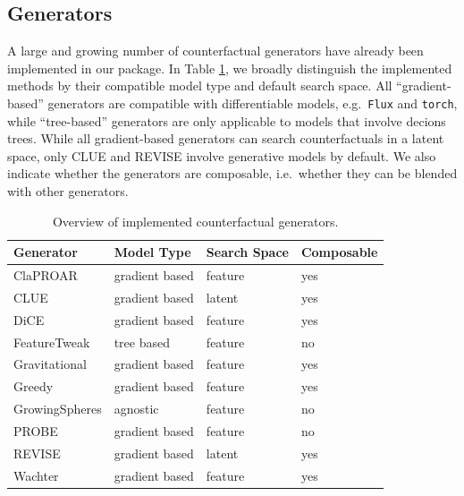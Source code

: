 \documentclass{juliacon}
\begin{document}
\hypertarget{generators}{%
\subsection{Generators}\label{generators}}

A large and growing number of counterfactual generators have already
been implemented in our package. In Table \ref{tab:gen}, we broadly
distinguish the implemented methods by their compatible model type and
default search space. All ``gradient-based'' generators are compatible
with differentiable models, e.g.~\texttt{Flux} and \texttt{torch}, while
``tree-based'' generators are only applicable to models that involve
decions trees. While all gradient-based generators can search
counterfactuals in a latent space, only CLUE and REVISE involve
generative models by default. We also indicate whether the generators
are composable, i.e.~whether they can be blended with other generators.

\begin{table}
\caption{Overview of implemented counterfactual generators. \label{tab:gen} \newline}
\centering
\fontsize{7}{9}\selectfont
\begin{tabular}[t]{llll}
\toprule
Generator & Model Type & Search Space & Composable\\
\midrule
ClaPROAR \cite{altmeyer2023endogenous} & gradient based & feature & yes\\
CLUE \cite{antoran2020getting} & gradient based & latent & yes\\
DiCE \cite{mothilal2020explaining} & gradient based & feature & yes\\
FeatureTweak \cite{tolomei2017interpretable} & tree based & feature & no\\
Gravitational \cite{altmeyer2023endogenous} & gradient based & feature & yes\\
Greedy \cite{schut2021generating} & gradient based & feature & yes\\
GrowingSpheres \cite{laugel2017inversea} & agnostic & feature & no\\
PROBE \cite{pawelczyk2022probabilistically} & gradient based & feature & no\\
REVISE \cite{joshi2019realistic} & gradient based & latent & yes\\
Wachter \cite{wachter2017counterfactual} & gradient based & feature & yes\\
\bottomrule
\end{tabular}
\end{table}
\end{document}

